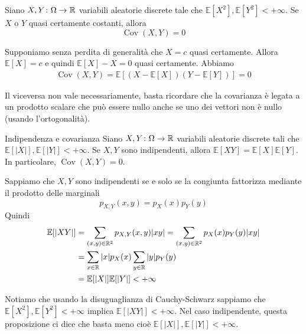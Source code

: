 \documentclass[a4paper]{article}
\begin{document}
\begin{snippetproposition}{}
    Siano \(X,Y \colon \Omega \to \mathbb{R}\) variabili aleatorie discrete
    tale che \(\mathbb E[X^2], \mathbb E[Y^2] < +\infty\).
    Se \(X\) o \(Y\) quasi certamente costanti, allora
    \[
        \operatorname{Cov}(X,Y) = 0
    \]
\end{snippetproposition}

\begin{snippetproof}{}
    Supponiamo senza perdita di generalità che \(X=c\) quasi certamente.
    Allora \(\mathbb E[X] = c\) e quindi \(\mathbb E[X] - X = 0\) quasi certamente.
    Abbiamo
    \begin{align*}
        \operatorname{Cov}(X,Y) =
        \mathbb E[(X-\mathbb E[X])(Y-\mathbb E[Y])]
        = 0
    \end{align*}
\end{snippetproof}

Il viceversa non vale necessariamente, basta ricordare che
la covarianza è legata
a un prodotto scalare che può essere nullo
anche se uno dei vettori non è nullo (usando l'ortogonalità).

\begin{snippetproposition}{Indipendenza e covarianza}
    Siano \(X,Y \colon \Omega \to \mathbb{R}\)
    variabili aleatorie discrete tali che
    \(\mathbb E[|X|], \mathbb E[|Y|]<+\infty\).
    Se \(X,Y\) sono indipendenti, allora \(\mathbb E[XY] = \mathbb E[X]\mathbb E[Y]\).
    In particolare, \(\operatorname{Cov}(X,Y) = 0\).
\end{snippetproposition}

\begin{snippetproof}{}
    Sappiamo che \(X,Y\) sono indipendenti se e solo se
    la congiunta fattorizza mediante il prodotto delle marginali
    \[
        p_{X,Y}(x,y) = p_X(x)p_Y(y)
    \]
    Quindi
    \begin{align*}
        \mathbb E[|XY|]
        &= \sum_{(x,y) \in \mathbb{R}^2}
        p_{X,Y}(x,y)|xy|
        = \sum_{(x,y) \in \mathbb{R}^2}
        p_X(x)p_Y(y)|xy| \\
        &= \sum_{x\in\mathbb{R}}|x|p_X(x) \sum_{y\in \mathbb{R}}|y| p_Y(y) \\
        &= \mathbb E[|X|] \mathbb E[|Y|] < +\infty
    \end{align*}
\end{snippetproof}

Notiamo che usando la disuguaglianza di Cauchy-Schwarz
sappiamo che \(\mathbb E[X^2], \mathbb E[Y^2] < +\infty\)
implica \(\mathbb E[|XY|] < +\infty\).
Nel caso indipendente, questa proposizione ci dice che basta
meno cioè \(\mathbb E[|X|], \mathbb E[|Y|] < +\infty\).
\end{document}
